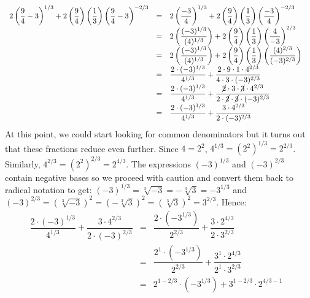 \begin{ex}
\begin{enumerate}
\[\begin{array}{rclr}
2 \left(\dfrac{9}{4} - 3\right)^{1/3} + 2\left(\dfrac{9}{4}\right)\left(\dfrac{1}{3}\right)\left(\dfrac{9}{4}-3\right)^{-2/3} & = &2 \left(\dfrac{-3}{4} \right)^{1/3} + 2\left(\dfrac{9}{4}\right)\left(\dfrac{1}{3}\right)\left(\dfrac{-3}{4}\right)^{-2/3} & \\ [5pt]

& = & 2 \left(\dfrac{(-3)^{1/3}}{(4)^{1/3}} \right) + 2\left(\dfrac{9}{4}\right)\left(\dfrac{1}{3}\right)\left(\dfrac{4}{-3}\right)^{2/3} & \\ [5pt]

& = & 2 \left(\dfrac{(-3)^{1/3}}{(4)^{1/3}} \right) + 2\left(\dfrac{9}{4}\right)\left(\dfrac{1}{3}\right)\left(\dfrac{(4)^{2/3}}{(-3)^{2/3}}\right) & \\ [5pt]

& = & \dfrac{2 \cdot (-3)^{1/3}}{4^{1/3}} + \dfrac{2 \cdot 9 \cdot 1 \cdot 4^{2/3}}{4 \cdot 3 \cdot (-3)^{2/3}} & \\ [5pt]

& = & \dfrac{2 \cdot (-3)^{1/3}}{4^{1/3}} + \dfrac{\cancel{2} \cdot 3 \cdot \cancel{3} \cdot 4^{2/3}}{2 \cdot \cancel{2} \cdot \cancel{3} \cdot (-3)^{2/3}} & \\ [5pt]

& = & \dfrac{2 \cdot (-3)^{1/3}}{4^{1/3}} + \dfrac{3 \cdot 4^{2/3}}{2 \cdot (-3)^{2/3}} & \\ \end{array} \] At this point, we could start looking for common denominators but it turns out that these fractions reduce even further.  Since $4 = 2^2$, $4^{1/3} = (2^2)^{1/3} = 2^{2/3}$.  Similarly, $4^{2/3} = (2^2)^{2/3} = 2^{4/3}$. The expressions $(-3)^{1/3}$ and $(-3)^{2/3}$ contain negative bases so we proceed with caution and convert them back to radical notation to get:  $(-3)^{1/3} = \sqrt[3]{-3} = -\sqrt[3]{3} = - 3^{1/3}$ and  $(-3)^{2/3} = (\sqrt[3]{-3})^2 = (-\sqrt[3]{3})^2 =(\sqrt[3]{3})^2 = 3^{2/3}$.  Hence:\[ \begin{array}{rclr}

\dfrac{2 \cdot (-3)^{1/3}}{4^{1/3}} + \dfrac{3 \cdot 4^{2/3}}{2 \cdot (-3)^{2/3}} & = & \dfrac{2 \cdot (-3^{1/3})}{2^{2/3}} + \dfrac{3 \cdot 2^{4/3}}{2 \cdot 3^{2/3}}  & \\ [3pt]

& = & \dfrac{2^{1} \cdot (-3^{1/3})}{2^{2/3}} + \dfrac{3^{1} \cdot 2^{4/3}}{2^{1} \cdot 3^{2/3}}  & \\ [3pt]

& = & 2^{1 - 2/3} \cdot (-3^{1/3}) +3^{1- 2/3} \cdot 2^{4/3 - 1}  & \\ [3pt]


\end{array}\]
\end{enumerate}
\end{ex}
